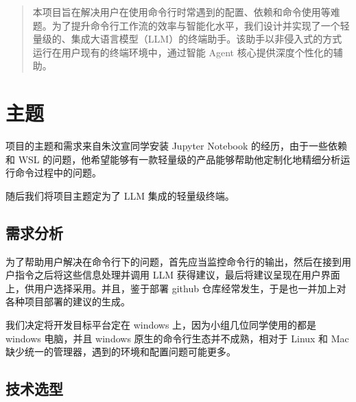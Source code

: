 \documentclass{article}
\theoremstyle{plain}
\theoremstyle{definition}
\theoremstyle{remark}
\begin{document}

\begin{abstract}
本项目旨在解决用户在使用命令行时常遇到的配置、依赖和命令使用等难题。为了提升命令行工作流的效率与智能化水平，我们设计并实现了一个轻量级的、集成大语言模型（LLM）的终端助手。该助手以非侵入式的方式运行在用户现有的终端环境中，通过智能 Agent 核心提供深度个性化的辅助。
\end{abstract}

\section{主题}

项目的主题和需求来自朱汶宣同学安装 Jupyter Notebook 的经历，由于一些依赖和 WSL 的问题，他希望能够有一款轻量级的产品能够帮助他定制化地精细分析运行命令过程中的问题。

随后我们将项目主题定为了 LLM 集成的轻量级终端。

\subsection{需求分析}

为了帮助用户解决在命令行下的问题，首先应当监控命令行的输出，然后在接到用户指令之后将这些信息处理并调用 LLM 获得建议，最后将建议呈现在用户界面上，供用户选择采用。并且，鉴于部署 github 仓库经常发生，于是也一并加上对各种项目部署的建议的生成。

我们决定将开发目标平台定在 windows 上，因为小组几位同学使用的都是 windows 电脑，并且 windows 原生的命令行生态并不成熟，相对于 Linux 和 Mac 缺少统一的管理器，遇到的环境和配置问题可能更多。

\subsection{技术选型}
\end{document}
